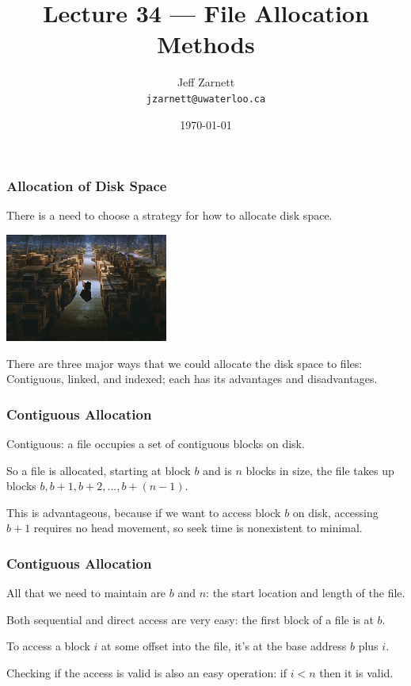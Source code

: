 

\title{Lecture 34 --- File Allocation Methods }

\author{Jeff Zarnett \\ \small \texttt{jzarnett@uwaterloo.ca}}
\date{\today}




\begin{frame}
  \titlepage

 \end{frame}


\begin{frame}
\frametitle{Allocation of Disk Space}

There is a need to choose a strategy for how to allocate disk space. 

\begin{center}
	\includegraphics[width=0.4\textwidth]{images/jones.jpg}
\end{center}

There are three major ways that we could allocate the disk space to files:\\
\quad Contiguous, linked, and indexed; each has its advantages and disadvantages.


\end{frame}

\begin{frame}
\frametitle{Contiguous Allocation}
Contiguous: a file occupies a set of contiguous blocks on disk. 

So a file is allocated, starting at block $b$ and is $n$ blocks in size, the file takes up blocks $b, b+1, b+2, ..., b+(n-1)$. 

This is advantageous, because if we want to access block $b$ on disk, accessing $b+1$ requires no head movement, so seek time is nonexistent to minimal.

\end{frame}

\begin{frame}
\frametitle{Contiguous Allocation}

All that we need to maintain are $b$ and $n$: the start location and length of the file. 

Both sequential and direct access are very easy: the first block of a file is at $b$. 

To access a block $i$ at some offset into the file, it's at the base address $b$ plus $i$. 

Checking if the access is valid is also an easy operation: if $i < n$ then it is valid.

\end{frame}

